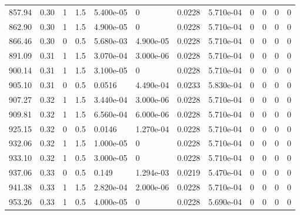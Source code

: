 \documentclass[preview]{standalone}
\begin{document}
{{{{{\begin{tabular}{L{1.2cm}C{1.2cm} C{0.3cm}C{0.5cm} C{1.4cm}C{1.4cm} C{1.4cm}C{1.4cm} C{1.6cm}C{1.6cm} C{1.6cm}C{1.6cm}}
  857.94  &  0.30  & 1     & 1.5 &  5.400e-05  & 0  &  0.0228&   5.710e-04& 0 & 0   &  0 & 0  \\ 
  862.90  &  0.30  & 1     & 1.5 &  4.900e-05  & 0  &  0.0228&   5.710e-04& 0 & 0   &  0 & 0  \\ 
  866.46  &  0.30  & 0     & 0.5 &  5.680e-03  & 4.900e-05  &  0.0228&   5.710e-04& 0 & 0   &  0 & 0  \\ 
  891.09  &  0.31  & 1     & 1.5 &  3.070e-04  & 3.000e-06  &  0.0228&   5.710e-04& 0 & 0   &  0 & 0  \\ 
  900.14  &  0.31  & 1     & 1.5 &  3.100e-05  & 0  &  0.0228&   5.710e-04& 0 & 0   &  0 & 0  \\ 
  905.10  &  0.31  & 0     & 0.5 &  0.0516  & 4.490e-04  &  0.0233&   5.830e-04& 0 & 0   &  0 & 0  \\ 
  907.27  &  0.32  & 1     & 1.5 &  3.440e-04  & 3.000e-06  &  0.0228&   5.710e-04& 0 & 0   &  0 & 0  \\ 
  909.81  &  0.32  & 1     & 1.5 &  6.560e-04  & 6.000e-06  &  0.0228&   5.710e-04& 0 & 0   &  0 & 0  \\ 
  925.15  &  0.32  & 0     & 0.5 &  0.0146  & 1.270e-04  &  0.0228&   5.710e-04& 0 & 0   &  0 & 0  \\ 
  932.06  &  0.32  & 1     & 1.5 &  1.000e-05  & 0  &  0.0228&   5.710e-04& 0 & 0   &  0 & 0  \\ 
  933.10  &  0.32  & 1     & 0.5 &  3.000e-05  & 0  &  0.0228&   5.710e-04& 0 & 0   &  0 & 0  \\ 
  937.06  &  0.33  & 0     & 0.5 &  0.149  & 1.294e-03  &  0.0219&   5.470e-04& 0 & 0   &  0 & 0  \\ 
  941.38  &  0.33  & 1     & 1.5 &  2.820e-04  & 2.000e-06  &  0.0228&   5.710e-04& 0 & 0   &  0 & 0  \\ 
  953.26  &  0.33  & 1     & 0.5 &  4.000e-05  & 0  &  0.0228&   5.690e-04& 0 & 0   &  0 & 0  \\ 
\hline 
\end{tabular} 

}}}}}
\end{document}
